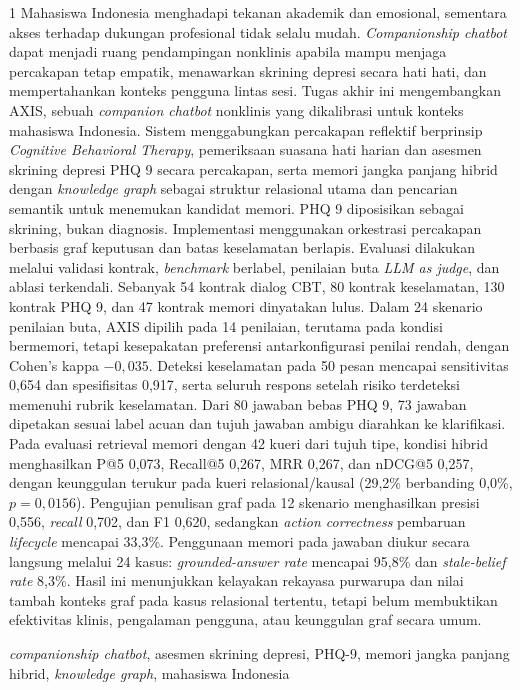 \begin{spacing}{1}
Mahasiswa Indonesia menghadapi tekanan akademik dan emosional, sementara akses terhadap dukungan profesional tidak selalu mudah. \textit{Companionship chatbot} dapat menjadi ruang pendampingan nonklinis apabila mampu menjaga percakapan tetap empatik, menawarkan skrining depresi secara hati hati, dan mempertahankan konteks pengguna lintas sesi. Tugas akhir ini mengembangkan AXIS, sebuah \textit{companion chatbot} nonklinis yang dikalibrasi untuk konteks mahasiswa Indonesia. Sistem menggabungkan percakapan reflektif berprinsip \textit{Cognitive Behavioral Therapy}, pemeriksaan suasana hati harian dan asesmen skrining depresi PHQ 9 secara percakapan, serta memori jangka panjang hibrid dengan \textit{knowledge graph} sebagai struktur relasional utama dan pencarian semantik untuk menemukan kandidat memori. PHQ 9 diposisikan sebagai skrining, bukan diagnosis. Implementasi menggunakan orkestrasi percakapan berbasis graf keputusan dan batas keselamatan berlapis. Evaluasi dilakukan melalui validasi kontrak, \textit{benchmark} berlabel, penilaian buta \textit{LLM as judge}, dan ablasi terkendali. Sebanyak 54 kontrak dialog CBT, 80 kontrak keselamatan, 130 kontrak PHQ 9, dan 47 kontrak memori dinyatakan lulus. Dalam 24 skenario penilaian buta, AXIS dipilih pada 14 penilaian, terutama pada kondisi bermemori, tetapi kesepakatan preferensi antarkonfigurasi penilai rendah, dengan Cohen's kappa $-0,035$. Deteksi keselamatan pada 50 pesan mencapai sensitivitas 0,654 dan spesifisitas 0,917, serta seluruh respons setelah risiko terdeteksi memenuhi rubrik keselamatan. Dari 80 jawaban bebas PHQ 9, 73 jawaban dipetakan sesuai label acuan dan tujuh jawaban ambigu diarahkan ke klarifikasi. Pada evaluasi retrieval memori dengan 42 kueri dari tujuh tipe, kondisi hibrid menghasilkan P@5 0,073, Recall@5 0,267, MRR 0,267, dan nDCG@5 0,257, dengan keunggulan terukur pada kueri relasional/kausal (29,2\% berbanding 0,0\%, $p = 0,0156$). Pengujian penulisan graf pada 12 skenario menghasilkan presisi 0,556, \textit{recall} 0,702, dan F1 0,620, sedangkan \textit{action correctness} pembaruan \textit{lifecycle} mencapai 33,3\%. Penggunaan memori pada jawaban diukur secara langsung melalui 24 kasus: \textit{grounded-answer rate} mencapai 95,8\% dan \textit{stale-belief rate} 8,3\%. Hasil ini menunjukkan kelayakan rekayasa purwarupa dan nilai tambah konteks graf pada kasus relasional tertentu, tetapi belum membuktikan efektivitas klinis, pengalaman pengguna, atau keunggulan graf secara umum.


\vspace{0.5cm}

 \textit{companionship chatbot}, asesmen skrining depresi, PHQ-9, memori jangka panjang hibrid, \textit{knowledge graph}, mahasiswa Indonesia
\end{spacing}
